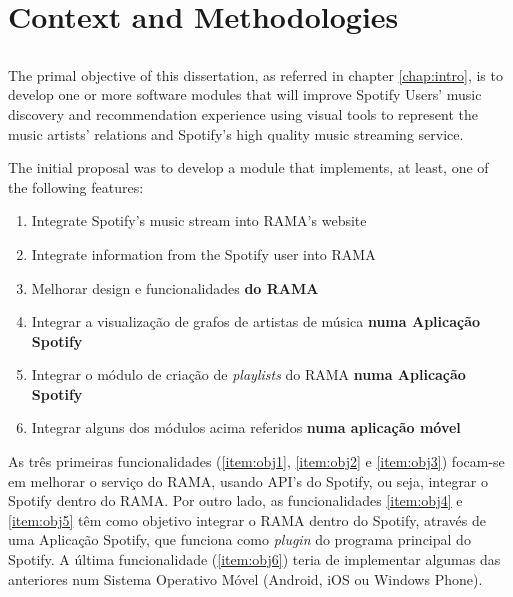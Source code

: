 
\chapter{Context and Methodologies}
\label{chap:chap3}

\section*{}

The primal objective of this dissertation, as referred in chapter \ref{chap:intro}, is to develop one or more software modules that will improve Spotify Users' music discovery and recommendation experience using visual tools to represent the music artists' relations and Spotify's high quality music streaming service.

The initial proposal was to develop a module that implements, at least, one of the following features:

\begin{enumerate}
  \item \label{item:obj1} Integrate Spotify's music stream into RAMA's website
  \item \label{item:obj2} Integrate information from the Spotify user into RAMA
  \item \label{item:obj3} Melhorar design e funcionalidades \textbf{do RAMA}
  \item \label{item:obj4} Integrar a visualização de grafos de artistas de música \textbf{numa Aplicação Spotify}
  \item \label{item:obj5} Integrar o módulo de criação de \emph{playlists} do RAMA \textbf{numa Aplicação Spotify}
  \item \label{item:obj6} Integrar alguns dos módulos acima referidos \textbf{numa aplicação móvel}
\end{enumerate}

As três primeiras funcionalidades (\ref{item:obj1}, \ref{item:obj2} e \ref{item:obj3}) focam-se em melhorar o serviço do RAMA, usando API's do Spotify, ou seja, integrar o Spotify dentro do RAMA.
Por outro lado, as funcionalidades \ref{item:obj4} e \ref{item:obj5} têm como objetivo integrar o RAMA dentro do Spotify, através de uma Aplicação Spotify, que funciona como \emph{plugin} do programa principal do Spotify.
A última funcionalidade (\ref{item:obj6}) teria de implementar algumas das anteriores num Sistema Operativo Móvel (Android, iOS ou Windows Phone).

